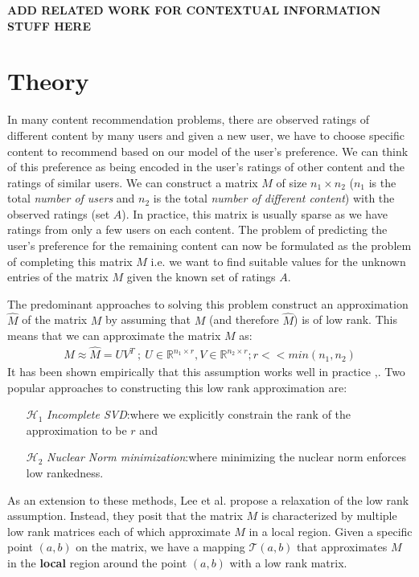 \documentclass[10 pt,table]{article}  %
\begin{document}
\textbf{ADD RELATED WORK FOR CONTEXTUAL INFORMATION STUFF HERE}
\section{Theory}
In many content recommendation problems, there are observed ratings of different content by many users and given a new user, we have to choose specific content to recommend based on our model of the user's preference. We can think of this preference as being encoded in the user's ratings of other content and the ratings of similar users. We can construct a matrix $M$ of size $n_1 \times n_2$ ($n_1$ is the total \emph{number of users} and $n_2$ is the total \emph{number of different content}) with the observed ratings (set $A$). In practice, this matrix is usually sparse as we have ratings from only a few users on each content. The problem of predicting the user's preference for the remaining content can now be formulated as the problem of completing this matrix $M$ i.e. we want to find suitable values for the unknown entries of the matrix $M$ given the known set of ratings $A$. 

The predominant approaches to solving this problem construct an approximation $\hat{M}$ of the matrix $M$ by assuming that $M$ (and therefore $\hat{M}$) is of low rank. This means that we can approximate the matrix $M$ as:
\begin{align}
M \approx \hat{M} = UV^T \ ; \ U \in \mathbb{R}^{n_1 \times r}, V \in \mathbb{R}^{n_2 \times r}; r << min(n_1,n_2)
\end{align} 
It has been shown empirically that this assumption works well in practice \cite{paterek2007improving},\cite{koren2009matrix}. Two popular approaches to constructing this low rank approximation are:
\begin{itemize}
\item[$\mathcal{H}_1$] \emph{Incomplete SVD}:where we explicitly constrain the rank of the approximation to be $r$ and
\item[$\mathcal{H}_2$] \emph{Nuclear Norm minimization}:where minimizing the nuclear norm enforces low rankedness.
\end{itemize}
As an extension to these methods, Lee et al. \cite{lee2013local} propose a relaxation of the low rank assumption. Instead, they posit that the matrix $M$ is characterized by multiple low rank matrices each of which approximate $M$ in a local region. Given a specific point $(a,b)$ on the matrix, we have a mapping $\mathcal{T}(a,b)$ that approximates $M$ in the \textbf{local} region around the point $(a,b)$ with a low rank matrix. 
\end{document}
